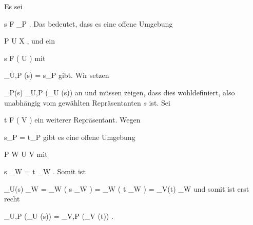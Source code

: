 {





Es sei

\mavergleichskette
{\vergleichskette
{ s
}
{ \in }{ { \mathcal  F   }_P
}
{  }{
}
{    }{
}
{   }{
}
}
{}{}{.}
Das bedeutet, dass es eine offene Umgebung

 {}
 {P \in U \subseteq X} {}
 {} {} {} {,}
und ein

\mavergleichskette
{\vergleichskette
{ s
}
{ \in }{ { \mathcal  F   }  \left(   U   \right)
}
{  }{
}
{    }{
}
{   }{
}
}
{}{}{}
mit

\mavergleichskette
{\vergleichskette
{ \rho_{U,P} (s)
}
{ = }{ s_P
}
{  }{
}
{    }{
}
{   }{
}
}
{}{}{}
gibt. Wir setzen

\mavergleichskettedisp
{\vergleichskette
{ \varphi_P(s)
}
{ } { \rho_{U,P} (\varphi_U (s))
}
{ } {
}
{ } {
}
{ } {
}
}
{}{}{}
an und müssen zeigen, dass dies wohldefiniert, also unabhängig vom gewählten Repräsentanten $s$
 {} {}
ist. Sei

\mavergleichskette
{\vergleichskette
{ t
}
{ \in }{ { \mathcal  F   }  \left(   V   \right)
}
{  }{
}
{    }{
}
{   }{
}
}
{}{}{}
ein weiterer Repräsentant. Wegen

\mavergleichskette
{\vergleichskette
{ s_P
}
{ = }{ t_P
}
{  }{
}
{    }{
}
{   }{
}
}
{}{}{}
gibt es eine offene Umgebung

\mavergleichskettedisp
{\vergleichskette
{ P
}
{ \in} { W
}
{ \subseteq} { U \cap V
}
{ } {
}
{ } {
}
}
{}{}{}
mit

\mavergleichskette
{\vergleichskette
{ s \vert_W
}
{ = }{ t \vert_W
}
{  }{
}
{    }{
}
{   }{
}
}
{}{}{.}
Somit ist

\mavergleichskettedisp
{\vergleichskette
{ \varphi_U(s) \vert_W
}
{ =} { \varphi_W \left(  s \vert_W  \right)
}
{ =} { \varphi_W \left(  t \vert_W  \right)
}
{ =} { \varphi_V(t) \vert_W
}
{ } {
}
}
{}{}{}
und somit ist erst recht

\mavergleichskettedisp
{\vergleichskette
{ \rho_{U,P} (\varphi_U (s))
}
{ =} { \rho_{V,P} (\varphi_V (t))
}
{ } {
}
{ } {
}
{ } {
}
}
{}{}{.}




}
